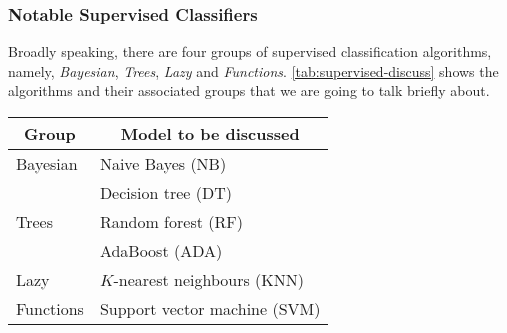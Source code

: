 \subsubsection{Notable Supervised Classifiers}
Broadly speaking, there are four groups of supervised classification algorithms, namely, \textit{Bayesian}, \textit{Trees}, \textit{Lazy} and \textit{Functions}. \autoref{tab:supervised-discuss} shows the algorithms and their associated groups that we are going to talk briefly about. 

\parbox{\linewidth}{
  \centering
  \begin{tabular}{|l|l|}
    \hline
    \multicolumn{1}{|c|}{\textbf{Group}} & \multicolumn{1}{|c|}{\textbf{Model to be discussed}}
    \\\hline
    Bayesian & Naive Bayes (NB) 
    \\\hline
    \multirow{3}{*}{Trees} & Decision tree (DT)
    \\
    & Random forest (RF)
    \\
    & AdaBoost (ADA)
    \\\hline
    Lazy & $K$-nearest neighbours (KNN) 
    \\\hline
    Functions & Support vector machine (SVM)
    \\\hline
  \end{tabular}

  \label{tab:supervised-discuss}
}


